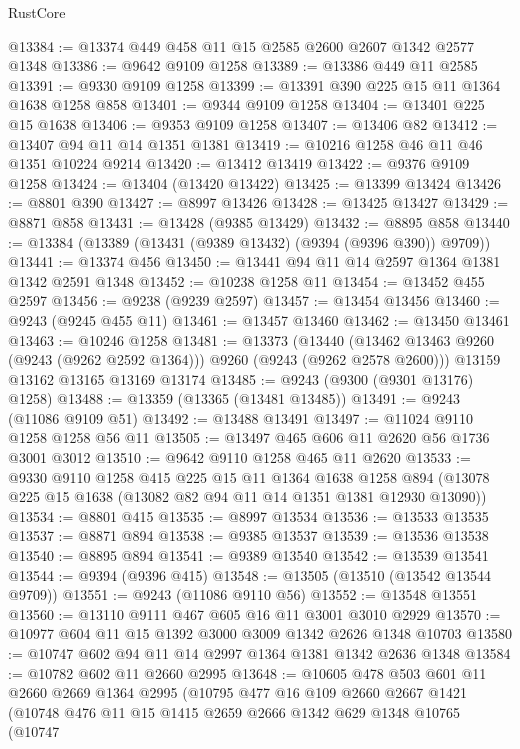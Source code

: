 \begin{lexlean}{RustCore}
\begin{coremodule}
@13384 := @13374 @449 @458 @11 @15 @2585 @2600 @2607 @1342 @2577 @1348
@13386 := @9642 @9109 @1258
@13389 := @13386 @449 @11 @2585
@13391 := @9330 @9109 @1258
@13399 := @13391 @390 @225 @15 @11 @1364 @1638 @1258 @858
@13401 := @9344 @9109 @1258
@13404 := @13401 @225 @15 @1638
@13406 := @9353 @9109 @1258
@13407 := @13406 @82
@13412 := @13407 @94 @11 @14 @1351 @1381
@13419 := @10216 @1258 @46 @11 @46 @1351 @10224 @9214
@13420 := @13412 @13419
@13422 := @9376 @9109 @1258
@13424 := @13404 (@13420 @13422)
@13425 := @13399 @13424
@13426 := @8801 @390
@13427 := @8997 @13426
@13428 := @13425 @13427
@13429 := @8871 @858
@13431 := @13428 (@9385 @13429)
@13432 := @8895 @858
@13440 := @13384 (@13389 (@13431 (@9389 @13432) (@9394 (@9396 @390)) @9709))
@13441 := @13374 @456
@13450 := @13441 @94 @11 @14 @2597 @1364 @1381 @1342 @2591 @1348
@13452 := @10238 @1258 @11
@13454 := @13452 @455 @2597
@13456 := @9238 (@9239 @2597)
@13457 := @13454 @13456
@13460 := @9243 (@9245 @455 @11)
@13461 := @13457 @13460
@13462 := @13450 @13461
@13463 := @10246 @1258
@13481 := @13373
    (@13440 (@13462 @13463 @9260 (@9243 (@9262 @2592 @1364))) @9260 (@9243 (@9262 @2578 @2600)))
    @13159
    @13162
    @13165
    @13169
    @13174
@13485 := @9243 (@9300 (@9301 @13176) @1258)
@13488 := @13359 (@13365 (@13481 @13485))
@13491 := @9243 (@11086 @9109 @51)
@13492 := @13488 @13491
@13497 := @11024 @9110 @1258 @1258 @56 @11
@13505 := @13497 @465 @606 @11 @2620 @56 @1736 @3001 @3012
@13510 := @9642 @9110 @1258 @465 @11 @2620
@13533 := @9330
    @9110
    @1258
    @415
    @225
    @15
    @11
    @1364
    @1638
    @1258
    @894
    (@13078 @225 @15 @1638 (@13082 @82 @94 @11 @14 @1351 @1381 @12930 @13090))
@13534 := @8801 @415
@13535 := @8997 @13534
@13536 := @13533 @13535
@13537 := @8871 @894
@13538 := @9385 @13537
@13539 := @13536 @13538
@13540 := @8895 @894
@13541 := @9389 @13540
@13542 := @13539 @13541
@13544 := @9394 (@9396 @415)
@13548 := @13505 (@13510 (@13542 @13544 @9709))
@13551 := @9243 (@11086 @9110 @56)
@13552 := @13548 @13551
@13560 := @13110 @9111 @467 @605 @16 @11 @3001 @3010 @2929
@13570 := @10977 @604 @11 @15 @1392 @3000 @3009 @1342 @2626 @1348 @10703
@13580 := @10747 @602 @94 @11 @14 @2997 @1364 @1381 @1342 @2636 @1348
@13584 := @10782 @602 @11 @2660 @2995
@13648 := @10605
    @478
    @503
    @601
    @11
    @2660
    @2669
    @1364
    @2995
    (@10795
      @477
      @16
      @109
      @2660
      @2667
      @1421
      (@10748
        @476
        @11
        @15
        @1415
        @2659
        @2666
        @1342
        @629
        @1348
        @10765
        (@10747

\end{coremodule}
\end{lexlean}
